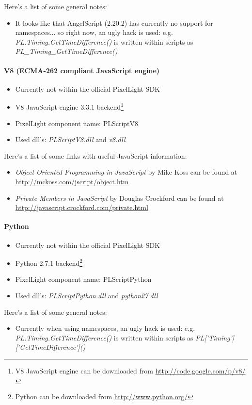 Here's a list of some general notes:
\begin{itemize}
\item It looks like that AngelScript (2.20.2) has currently no support for namespaces... so right now, an ugly hack is used: e.g. \emph{PL.Timing.GetTimeDifference()} is written within scripts as \emph{PL\_Timing\_GetTimeDifference()}
\end{itemize}


\paragraph{V8 (ECMA-262 compliant JavaScript engine)}
\begin{itemize}
\item Currently not within the official PixelLight SDK
\item V8 JavaScript engine 3.3.1 backend\footnote{V8 JavaScript engine can be downloaded from \url{http://code.google.com/p/v8/}}
\item PixelLight component name: PLScriptV8
\item Used dll's: \emph{PLScriptV8.dll} and \emph{v8.dll}
\end{itemize}

Here's a list of some links with useful JavaScript information:
\begin{itemize}
\item \emph{Object Oriented Programming in JavaScript} by Mike Koss  can be found at \url{http://mckoss.com/jscript/object.htm}
\item \emph{Private Members in JavaScript} by Douglas Crockford can be found at \url{http://javascript.crockford.com/private.html}
\end{itemize}


\paragraph{Python}
\begin{itemize}
\item Currently not within the official PixelLight SDK
\item Python 2.7.1 backend\footnote{Python can be downloaded from \url{http://www.python.org/}}
\item PixelLight component name: PLScriptPython
\item Used dll's: \emph{PLScriptPython.dll} and \emph{python27.dll}
\end{itemize}

Here's a list of some general notes:
\begin{itemize}
\item Currently when using namespaces, an ugly hack is used: e.g. \emph{PL.Timing.GetTimeDifference()} is written within scripts as \emph{PL['Timing']['GetTimeDifference']()}
\end{itemize}
